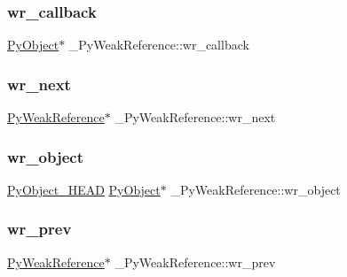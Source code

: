 \mbox{\label{struct___py_weak_reference_a29e417c1f334eae9241f47b20c4749b4}} 
\subsubsection{\texorpdfstring{wr\_callback}{wr\_callback}}
{\footnotesize\ttfamily \mbox{\hyperlink{_python27_2object_8h_aadc84ac7aed2cfa6f20c25f62bf3dac7}{Py\+Object}}$\ast$ \+\_\+\+Py\+Weak\+Reference\+::wr\+\_\+callback}

\mbox{\label{struct___py_weak_reference_ac301935218d7aebcf18f107ca4f1b894}} 
\subsubsection{\texorpdfstring{wr\_next}{wr\_next}}
{\footnotesize\ttfamily \mbox{\hyperlink{weakrefobject_8h_a7d8920320e9b260a1cab32ab0380add2}{Py\+Weak\+Reference}}$\ast$ \+\_\+\+Py\+Weak\+Reference\+::wr\+\_\+next}

\mbox{\label{struct___py_weak_reference_a7a8c9bd3258c64957e04f9104268ae88}} 
\subsubsection{\texorpdfstring{wr\_object}{wr\_object}}
{\footnotesize\ttfamily \mbox{\hyperlink{_python27_2object_8h_a0bf35c1f3ea13f925de94d8593db3b7e}{Py\+Object\+\_\+\+H\+E\+AD}} \mbox{\hyperlink{_python27_2object_8h_aadc84ac7aed2cfa6f20c25f62bf3dac7}{Py\+Object}}$\ast$ \+\_\+\+Py\+Weak\+Reference\+::wr\+\_\+object}

\mbox{\label{struct___py_weak_reference_a437c4c0b40ca4b8c011795c49351eacd}} 
\subsubsection{\texorpdfstring{wr\_prev}{wr\_prev}}
{\footnotesize\ttfamily \mbox{\hyperlink{weakrefobject_8h_a7d8920320e9b260a1cab32ab0380add2}{Py\+Weak\+Reference}}$\ast$ \+\_\+\+Py\+Weak\+Reference\+::wr\+\_\+prev}



